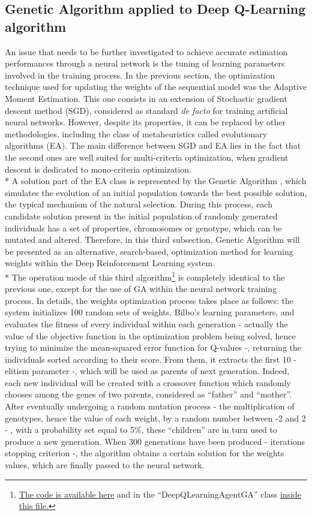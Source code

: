 \subsection{Genetic Algorithm applied to Deep Q-Learning algorithm}
An issue that needs to be further investigated to achieve accurate estimation performances through a neural network is the tuning of learning parameters involved in the training process. In the previous section, the optimization technique used for updating the weights of the sequential model was the Adaptive Moment Estimation. This one consists in an extension of Stochastic gradient descent method (SGD), considered as standard \textit{de facto} for training artificial neural networks. However, despite its properties, it can be replaced by other methodologies, including the class of metaheuristics called evolutionary algorithms (EA). The main difference between SGD and EA lies in the fact that the second ones are well suited for multi-criteria optimization, when gradient descent is dedicated to mono-criteria optimization.\\*
A solution part of the EA class is represented by the Genetic Algorithm \cite{7}, which simulates the evolution of an initial population towards the best possible solution, the typical mechanism of the natural selection. During this process, each candidate solution present in the initial population of randomly generated individuals has a set of properties, chromosomes or genotype, which can be mutated and altered. 
Therefore, in this third subsection, Genetic Algorithm will be presented as an alternative, search-based, optimization method for learning weights within the Deep Reinforcement Learning system.\\*
The operation mode of this third algorithm\footnote{\href{https://github.com/moiraghif/DragonHunting/blob/master/Bilbo\%20World/Bilbo_ga_deep_feels.py}{The code is available here} and in the ``DeepQLearningAgentGA'' class \href{https://github.com/moiraghif/DragonHunting/blob/master/Bilbo\%20World/agents.py}{inside this file.}} is completely identical to the previous one, except for the use of GA within the neural network training process. In details, the weights optimization process takes place as follows: the system initializes 100 random sets of weights, Bilbo's learning parameters, and evaluates the fitness of every individual within each generation - actually the value of the objective function in the optimization problem being solved, hence trying to minimize the mean-squared error function for Q-values -, returning the individuals sorted according to their score. From them, it extracts the first 10 - elitism parameter -, which will be used as parents of next generation. Indeed, each new individual will be created with a crossover function which randomly chooses among the genes of two parents, considered as ``father'' and ``mother''. After eventually undergoing a random mutation process - the multiplication of genotypes, hence the value of each weight, by a random number between -2 and 2 - , with a probability set equal to 5\%, these ``children'' are in turn used to produce a new generation. When 300 generations have been produced - iterations stopping criterion -, the algorithm obtains a certain solution for the weights values, which are finally passed to the neural network. 
